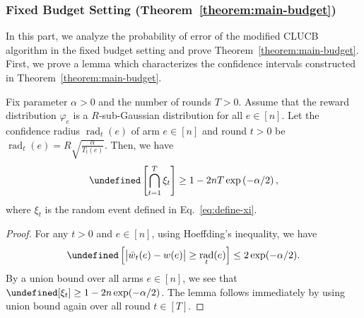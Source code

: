 \documentclass{article}
\newcommand{\Algorithm}{{\small \textsf{CLUCB}}\xspace}
\newcommand{\Rew}{\varphi}
\DeclareMathOperator{\rad}{rad}
\let\Pr\undefined
\DeclareMathOperator{\Pr}{Pr}
\begin{document}
\subsubsection{Fixed Budget Setting (Theorem~\ref{theorem:main-budget})}
In this part, we analyze the probability of error of the modified \Algorithm algorithm in the fixed budget setting and prove Theorem~\ref{theorem:main-budget}. 
First, we prove a lemma which characterizes the confidence intervals constructed in Theorem~\ref{theorem:main-budget}.
\begin{lemma}
Fix parameter $\alpha > 0$ and the number of rounds $T > 0$.
Assume that the reward distribution $\Rew_e$ is a $R$-sub-Gaussian distribution for all $e\in [n]$.
Let the confidence radius $\rad_t(e)$ of arm $e\in[n]$ and round $t>0$ be 
$\rad_t(e)=R\sqrt{\frac{\alpha}{T_t(e)}}.$
Then, we have
$$
\Pr\left[\bigcap_{t=1}^T \xi_t \right] \ge 1-2nT\exp\left(-\alpha/2\right),
$$
where $\xi_t$ is the random event defined in Eq.~\eqref{eq:define-xi}.
\label{lemma:ci-budget}
\end{lemma}
\begin{proof}
For any $t>0$ and $e\in[n]$, using Hoeffding's inequality, we have
$$
\Pr\left[ \big|\bar w_t(e)-w(e) \big| \ge \rad_t(e) \right] \le 2\exp(-\alpha/2).
$$
By a union bound over all arms $e\in[n]$, we see that $\Pr[\xi_t] \ge 1-2n\exp(-\alpha/2)$. 
The lemma follows immediately by using union bound again over all round $t\in [T]$.
\end{proof}
\end{document}
